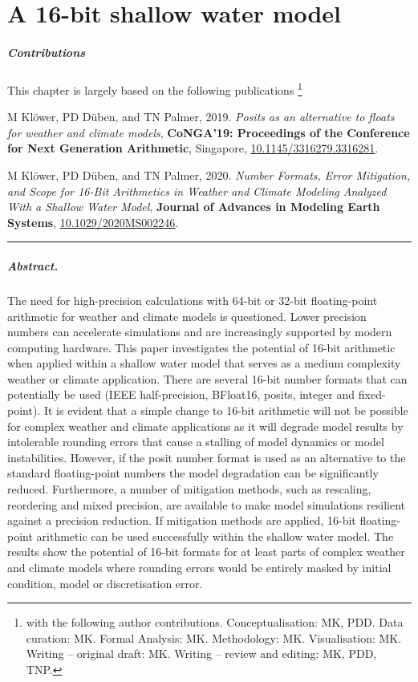 \chapter{A 16-bit shallow water model}
\label{chap:shallow_water}

\small \paragraph{Contributions} This chapter is largely based on the following publications \footnote{with the following author contributions.
Conceptualisation: MK, PDD. Data curation: MK. Formal Analysis: MK. Methodology: MK. Visualisation: MK. Writing – original draft:
MK. Writing – review and editing: MK, PDD, TNP.}

\vspace{\baselineskip}
\indent M Klöwer, PD Düben, and TN Palmer, 2019. \emph{Posits as an alternative to floats for weather and climate models},
\textbf{CoNGA'19: Proceedings of the Conference for Next Generation Arithmetic}, Singapore,
\href{https://doi.org/10.1145/3316279.3316281}{10.1145/3316279.3316281}.

\indent M Klöwer, PD Düben, and TN Palmer, 2020. \emph{Number Formats, Error Mitigation, and Scope for 16-Bit Arithmetics
in Weather and Climate Modeling Analyzed With a Shallow Water Model}, \textbf{Journal of Advances in Modeling Earth Systems},
\href{https://doi.org/10.1029/2020MS002246}{10.1029/2020MS002246}.
\vspace{\baselineskip}
\hrule
\vspace{\baselineskip}
\normalsize

\paragraph{Abstract.} The need for high-precision calculations with 64-bit or 32-bit floating-point arithmetic for weather and
climate models is questioned. Lower precision numbers can accelerate simulations and are increasingly supported
by modern computing hardware. This paper investigates the potential of 16-bit arithmetic when applied within a shallow
water model that serves as a medium complexity weather or climate application. There are several 16-bit number
formats that can potentially be used (IEEE half-precision, BFloat16, posits, integer and fixed-point). It is evident that a
simple change to 16-bit arithmetic will not be possible for complex weather and climate applications as it will degrade model
results by intolerable rounding errors that cause a stalling of model dynamics or model instabilities. However, if the posit number
format is used as an alternative to the standard floating-point numbers the model degradation can be significantly reduced.
Furthermore, a number of mitigation methods, such as rescaling, reordering and mixed precision, are available to make model
simulations resilient against a precision reduction. If mitigation methods are applied, 16-bit floating-point arithmetic can be used
successfully within the shallow water model. The results show the potential of 16-bit formats for at least parts of complex weather
and climate models where rounding errors would be entirely masked by initial condition, model or discretisation error.

